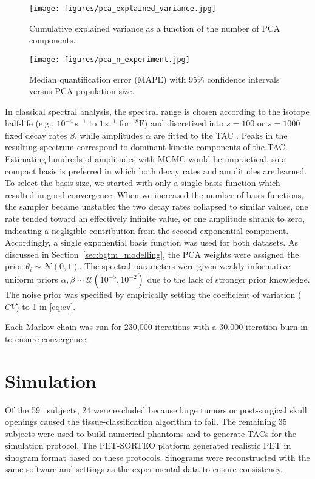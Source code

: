 \begin{figure}[h]
	\centering
	\texttt{[image: figures/pca\_explained\_variance.jpg]}
	\caption{Cumulative explained variance as a function of the number of PCA components.}
	\label{fig:pca_variance}
\end{figure}

\begin{figure}[h]
	\centering
	\texttt{[image: figures/pca\_n\_experiment.jpg]}
	\caption{Median quantification error (MAPE) with 95\% confidence intervals versus PCA population size.}
	\label{fig:pca_population}
\end{figure}

In classical spectral analysis, the spectral range is chosen according to the isotope half-life (e.g., \(10^{-4}\,\mathrm{s}^{-1}\) to \(1\,\mathrm{s}^{-1}\) for \(^{18}\mathrm{F}\)) and discretized into \(s=100\) or \(s=1000\) fixed decay rates \(\beta\), while amplitudes \(\alpha\) are fitted to the TAC \cite{cunningham1993spectral}.
Peaks in the resulting spectrum correspond to dominant kinetic components of the TAC.
Estimating hundreds of amplitudes with MCMC would be impractical, so a compact basis is preferred in which both decay rates and amplitudes are learned.
To select the basis size, we started with only a single basis function which resulted in good convergence.
When we increased the number of basis functions, the sampler became unstable: the two decay rates collapsed to similar values, one rate tended toward an effectively infinite value, or one amplitude shrank to zero, indicating a negligible contribution from the second exponential component.
Accordingly, a single exponential basis function was used for both datasets.
As discussed in Section~\ref{sec:bgtm_modelling}, the PCA weights were assigned the prior \(\theta_i\sim\mathcal{N}(0,1)\).
The spectral parameters were given weakly informative uniform priors \(\alpha,\beta\sim\mathcal{U}(10^{-5},10^{-2})\) due to the lack of stronger prior knowledge.
The noise prior was specified by empirically setting the coefficient of variation ($CV$) to 1 in \eqref{eq:cv}.

Each Markov chain was run for 230{,}000 iterations with a 30{,}000-iteration burn-in to ensure convergence.

\section{Simulation}\label{sec:results_simulation}
Of the 59 \fdg\ subjects, 24 were excluded because large tumors or post-surgical skull openings caused the tissue-classification algorithm to fail.
The remaining 35 subjects were used to build numerical phantoms and to generate TACs for the simulation protocol.
The PET-SORTEO platform generated realistic PET in sinogram format based on these protocols.
Sinograms were reconstructed with the same software and settings as the experimental data to ensure consistency.

